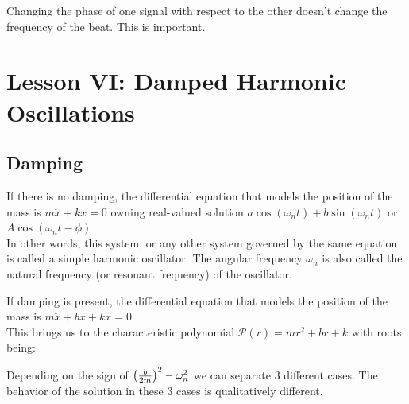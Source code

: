 \documentclass[11pt, openright]{book}
\begin{document}
Changing the phase of one signal with respect to the other doesn't change the frequency of the beat. This is important.

\newpage

\section{Lesson VI: Damped Harmonic Oscillations}

\subsection{Damping}

If there is no damping, the differential equation that models the position of the mass is $m\ddot{x}+kx=0$ owning real-valued solution $a\cos(\omega_n t)+b\sin(\omega_n t)$ or $A\cos(\omega_n t-\phi)$\\
In other words, this system, or any other system governed by the same equation is called a simple harmonic oscillator. The angular frequency $\omega_n$ is also called the natural frequency (or resonant frequency) of the oscillator.

If damping is present, the differential equation that models the position of the mass is $m\ddot{x}+b\dot{x}+kx=0$\\
This brings us to the characteristic polynomial $\mathcal{P}(r)=mr^2+br+k$ with roots being:

Depending on the sign of $\left( \frac{b}{2m} \right)^2-\omega_{n}^2$ we can separate 3 different cases. The behavior of the solution in these 3 cases is qualitatively different.
\end{document}
